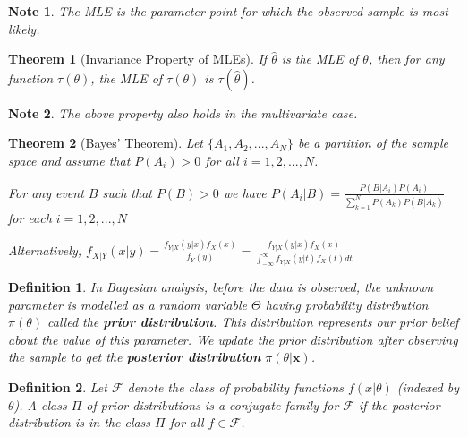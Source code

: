 \documentclass[14pt,twoside]{extreport}
\theoremstyle{dotless}
\newtheorem*{defn}{Definition}
\newtheorem*{thm}{Theorem} %
\newtheorem*{note}{Note} %
\begin{document}
\begin{note}
    The MLE is the parameter point for which the observed sample is most likely.
\end{note}

\begin{thm}[Invariance Property of MLEs]
    If $\hat{\theta}$ is the MLE of $\theta$, then for any function $\tau(\theta)$, the MLE of $\tau(\theta)$ is $\tau(\hat{\theta})$.
\end{thm}

\begin{note}
    The above property also holds in the multivariate case.
\end{note}

\begin{thm}[Bayes' Theorem]
    Let $\{ A_1, A_2, ..., A_N \}$ be a partition of the sample space and assume that $P(A_i) > 0$ for all $i = 1,2, ..., N$. 

    For any event $B$ such that $P(B) > 0$ we have $P(A_i | B) = \frac{P(B|A_i)P(A_i)}{\sum_{k=1}^N P(A_k) P(B|A_k)}$ for each $i = 1, 2, ..., N$


    Alternatively, $f_{X|Y}(x|y) = \frac{f_{Y|X}(y|x) f_X(x)}{f_Y(y)} = \frac{f_{Y|X} (y|x) f_X(x)}{\int_{-\infty}^{\infty} f_{Y|X} (y|t) f_X(t) dt }$
\end{thm}

\begin{defn}
    In Bayesian analysis, before the data is observed, the unknown parameter is modelled as a random variable $\Theta$ having probability distribution $\pi(\theta)$ called the \textbf{prior distribution}. This distribution represents our prior belief about the value of this parameter. We update the prior distribution after observing the sample to get the \textbf{posterior distribution} $\pi(\theta|\bm{x})$.
\end{defn}

\begin{defn}
    Let $\mathcal{F}$ denote the class of probability functions $f(x|\theta)$ (indexed by $\theta$). A class $\Pi$ of prior distributions is a conjugate family for $\mathcal{F}$ if the posterior distribution is in the class $\Pi$ for all $f \in \mathcal{F}$.
\end{defn}
\end{document}
